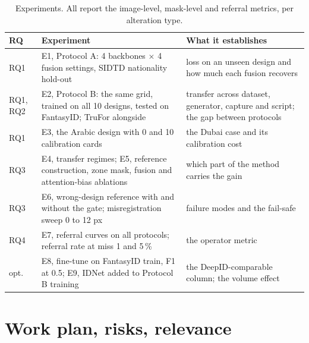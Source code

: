 \documentclass[11pt,a4paper]{article}
\begin{document}
\begin{table}[H]
\centering\footnotesize
\setlength{\tabcolsep}{4pt}
\caption{Experiments. All report the image-level, mask-level and referral metrics, per alteration type.}
\label{tab:experiments}
\begin{tabular}{L{1.1cm}L{7.2cm}L{5.6cm}}
\toprule
RQ & Experiment & What it establishes \\
\midrule
RQ1 & E1, Protocol A: 4 backbones $\times$ 4 fusion settings, SIDTD nationality hold-out & loss on an unseen design and how much each fusion recovers \\
RQ1, RQ2 & E2, Protocol B: the same grid, trained on all 10 designs, tested on FantasyID; TruFor alongside & transfer across dataset, generator, capture and script; the gap between protocols \\
RQ1 & E3, the Arabic design with 0 and 10 calibration cards & the Dubai case and its calibration cost \\
RQ3 & E4, transfer regimes; E5, reference construction, zone mask, fusion and attention-bias ablations & which part of the method carries the gain \\
RQ3 & E6, wrong-design reference with and without the gate; misregistration sweep 0 to 12 px & failure modes and the fail-safe \\
RQ4 & E7, referral curves on all protocols; referral rate at miss 1 and 5\,\% & the operator metric \\
opt. & E8, fine-tune on FantasyID train, F1 at 0.5; E9, IDNet added to Protocol B training & the DeepID-comparable column; the volume effect \\
\bottomrule
\end{tabular}
\end{table}

\FloatBarrier
\section{Work plan, risks, relevance}
\label{sec:plan}
\end{document}

